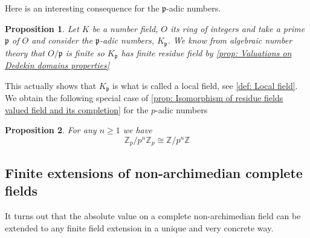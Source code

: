 \documentclass{article}
\newtheorem{proposition}{Proposition}[section]
\newcommand{\mfrak}[1]{\mathfrak{#1}}
\newcommand{\mbb}[1]{\mathbb{#1}}
\numberwithin{equation}{section}
\begin{document}
Here is an interesting consequence for the $\mfrak p$-adic numbers.
\begin{proposition}\label{fact: The P-adic numbers is a local ring}
    Let $K$ be a number field, $O$ its ring of integers and take a prime $\mfrak p$ of $O$ and consider the $\mfrak p$-adic numbers, $K_\mfrak p$. We know from algebraic number theory that $O / \mfrak p$ is finite so $K_\mfrak p$ has finite residue field by \cref{prop: Valuations on Dedekin domains properties}
\end{proposition}
This actually shows that $K_\mfrak p$ is what is called a local field, see \cref{def: Local field}. We obtain the following special case of \cref{prop: Isomorphism of residue fields valued field and its completion} for the $p$-adic numbers
\begin{proposition}\label{prop: Isomorphism of residue fields valued field and its completion special case}
    For any $n \geq 1$ we have
    $$\mbb Z_p / p^n \mbb Z_p \cong \mbb Z / p^n \mbb Z$$
\end{proposition}


\subsection{Finite extensions of non-archimedian complete fields}

It turns out that the absolute value on a complete non-archimedian field can be extended to any finite field extension in a unique and very concrete way. 
\end{document}
